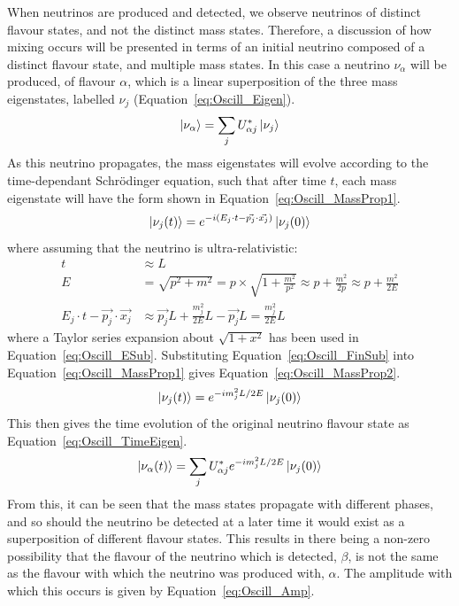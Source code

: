 When neutrinos are produced and detected, we observe neutrinos of distinct flavour states, and not the distinct mass states. Therefore, a discussion of how mixing occurs will be presented in terms of an initial neutrino composed of a distinct flavour state, and multiple mass states. In this case a neutrino $\nu_\alpha$ will be produced, of flavour $\alpha$, which is a linear superposition of the three mass eigenstates, labelled $\nu_j$ (Equation~\ref{eq:Oscill_Eigen}). 
\begin{equation}
  \label{eq:Oscill_Eigen}
  \ket{\nu_\alpha} = \sum_{j}U^{\ast}_{\alpha j}\ket{\nu_j}
\end{equation}
As this neutrino propagates, the mass eigenstates will evolve according to the time-dependant Schr\"{o}dinger equation, such that after time $t$, each mass eigenstate will have the form shown in Equation~\ref{eq:Oscill_MassProp1}.
\begin{equation}
  \label{eq:Oscill_MassProp1}
  \ket{\nu_j(t)} = e^{-i(E_{j}\cdot t - \vec{p_{j}}\cdot\vec{x_{j}})}\ket{\nu_j(0)}
\end{equation}
where assuming that the neutrino is ultra-relativistic:
\begin{align}
  t &\approx L \label{eq:Oscill_t2L} \\
  E &= \sqrt{p^2+m^2} = p \times \sqrt{1+\frac{m^2}{p^2}} \approx p + \frac{m^2}{2p} \approx p + \frac{m^2}{2E} \label{eq:Oscill_ESub} \\
  E_{j}\cdot t - \vec{p_{j}}\cdot\vec{x_{j}} &\approx \vec{p_{j}}L + \frac{m_{j}^2}{2E}L - \vec{p_{j}}L = \frac{m_{j}^2}{2E}L \label{eq:Oscill_FinSub}  
\end{align}
where a Taylor series expansion about $\sqrt{1+x^2}$ has been used in Equation~\ref{eq:Oscill_ESub}. Substituting Equation~\ref{eq:Oscill_FinSub} into Equation~\ref{eq:Oscill_MassProp1} gives Equation~\ref{eq:Oscill_MassProp2}.
\begin{equation}
  \label{eq:Oscill_MassProp2}
  \ket{\nu_j(t)} = e^{-im_{j}^{2}L/2E}\ket{\nu_j(0)}
\end{equation}
This then gives the time evolution of the original neutrino flavour state as Equation~\ref{eq:Oscill_TimeEigen}.
\begin{equation}
  \label{eq:Oscill_TimeEigen}
  \ket{\nu_\alpha(t)} = \sum_{j}U^{\ast}_{\alpha j}e^{-im_{j}^{2}L/2E}\ket{\nu_j(0)}
\end{equation}
From this, it can be seen that the mass states propagate with different phases, and so should the neutrino be detected at a later time it would exist as a superposition of different flavour states. This results in there being a non-zero possibility that the flavour of the neutrino which is detected, $\beta$, is not the same as the flavour with which the neutrino was produced with, $\alpha$. The amplitude with which this occurs is given by Equation~\ref{eq:Oscill_Amp}.
